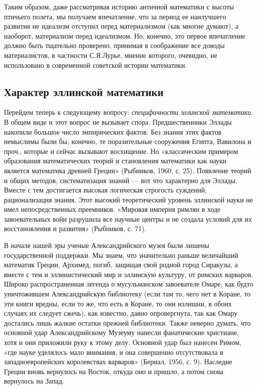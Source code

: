 Таким образом, даже рассматривая историю античной математики с высоты
птичьего полета, мы получаем впечатление, что за период ее наилучшего
развития не идеализм отступил перед материализмом (как многие думают),
а наоборот, материализм перед идеализмом. Но, конечно, это первое
впечатление должно быть тщательно проверено, принимая в соображение
все доводы материалистов, в частности С.Я.Лурье, мнение которого,
очевидно, не использовано в современной советской истории математики.

\subsection{Характер эллинской математики}

Перейдем теперь к следующему вопросу: \emph{специфичности эллинской
математики}. В общем виде и этот вопрос не вызывает спора.
Предшественники Эллады накопили большое число эмпирических фактов. Без
знания этих фактов немыслимы были бы, конечно, те поразительные
сооружения Египта, Вавилона и проч., которые и сейчас вызывают
восхищение. Но «классическим примером образования математических
теорий и становления математики как науки является математика древней
Греции» (Рыбников, 1960, с. 25). Появление теорий и общих методов,
систематизация знаний --- вот что характерно для Эллады. Вместе с тем
достигается высокая логическая строгость суждений, рационализация
знания. Этот высокий теоретический уровень эллинской науки не имел
непосредственных преемников. «Мировая империя римлян в ходе
завоевательных войн разрушила все научные центры и не создала условий
для их восстановления и развития» (Рыбников, с. 71).

В начале нашей эры ученые Александрийского музея были лишены
государственной поддержки. Мы знаем, что значительно раньше величайший
математик Греции, Архимед, погиб, защищая свой родной город Сиракузы,
а вместе с тем и эллинистический мир и эллинскую культуру, от римских
варваров. Широко распространенная легенда о мусульманском завоевателе
Омаре, как будто уничтожившем Александрийскую библиотеку (если там то,
чего нет в Коране, то эти книги вредны, если то же, что есть в Коране,
то они излишни, в обоих случаях их следует сжечь), как известно, давно
опровергнута, так как Омару достались лишь жалкие остатки прежней
библиотеки. Также неверно думать, что основной удар Александрийскому
Музеуму нанесли фанатические христиане, хотя и они приложили руку к
этому делу. Основной удар был нанесен Римом, «где науке уделялось мало
внимания, и она совершенно отсутствовала в западноевропейских
королевствах варваров» (Бернал, 1956, с. 9). Наследие Греции вновь
вернулось на Восток, откуда оно и пришло, а потом снова вернулось на
Запад.

